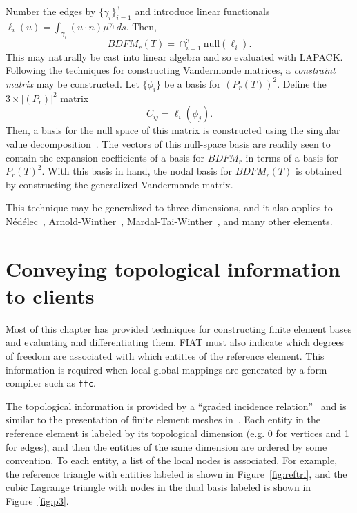 Number the edges by \( \{ \gamma_i \}_{i=1}^3 \) and introduce linear
functionals \\ \( \ell_i(u) = \int_{\gamma_i} (u \cdot n) \mu^{\gamma_i}
\, ds \).  Then,
\[
BDFM_r(T) = \cap_{i=1}^3 \mathrm{null}(\ell_i).
\]
This may naturally be cast into linear algebra and so evaluated with
LAPACK.  Following the techniques for constructing Vandermonde matrices,
a \emph{constraint matrix} may be constructed.  Let \( \{ \bar{\phi}_i \}
\) be a basis for \( (P_r(T))^2 \).  Define the \( 3 \times |(P_r)|^2
\) matrix
\[
C_{ij} = \ell_i( \phi_j ).
\]
Then, a basis for the null space of this matrix is constructed using
the singular value decomposition~\citep{GolubVan1996}.  The vectors of this
null-space basis are readily seen to contain the expansion coefficients
of a basis for \( BDFM_r \) in terms of a basis for \( P_r(T)^2 \).
With this basis in hand, the nodal basis for \( BDFM_r(T) \) is obtained
by constructing the generalized Vandermonde matrix.

This technique may be generalized to three dimensions,
and it also applies to N\'ed\'elec~\citep{Nedelec1980},
Arnold-Winther~\citep{ArnoldWinther2002},
Mardal-Tai-Winther~\citep{MardalTaiWinther2002}, and many other elements.


\section{Conveying topological information to clients}

Most of this chapter has provided techniques for constructing finite
element bases and evaluating and differentiating them.  FIAT must also
indicate which degrees of freedom are associated with which entities of
the reference element.  This information is required when local-global
mappings are generated by a form compiler such as \texttt{ffc}.

The topological information is provided by a ``graded incidence
relation''~\citep{Kirby2006a,KnepleyKarpeev2009} and is similar to the
presentation of finite element meshes in~\citet{Logg2009}.  Each entity in
the reference element is labeled by its topological dimension (e.g. 0 for
vertices and 1 for edges), and then the entities of the same dimension
are ordered by some convention.  To each entity, a list of the local nodes
is associated.  For example, the reference triangle with entities labeled
is shown in Figure~\ref{fig:reftri}, and the cubic Lagrange triangle
with nodes in the dual basis labeled is shown in Figure~\ref{fig:p3}.


